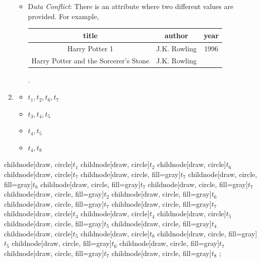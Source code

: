 \documentclass{scrartcl}
\begin{document}
\begin{enumerate}
\begin{itemize}
			\item D\textit{ata Conflict}: There is an attribute where two different values are provided.
			For example,
			\begin{center}
				\begin{tabular}{|c|c|c|}
					\hline
					title & author & year\\
					\hline
					Harry Potter 1 & J.K. Rowling & 1996\\
					Harry Potter and the Sorcerer's Stone & J.K. Rowling &\\
					\hline
				\end{tabular}.
			\end{center}
		\end{itemize}
		
		\item\phantom{phantom}
		\begin{itemize}
			\item $t_1, t_2, t_6, t_7$
			\item $t_3, t_4, t_5$
			\item $t_4, t_5$
			\item $t_4, t_8$
		\end{itemize}
	\end{enumerate}
	\begin{landscape}
		\pagestyle{empty}
		\begin{center}
			\hspace*{-5.5cm}
			\begin{tikz}[level 1/.style={sibling distance=3.7cm},
				level 2/.style={sibling distance=1.5cm},
				level 3/.style={sibling distance=1cm},
				level 4/.style={sibling distance=3cm}]
				child{node[draw, circle]{$t_1$}
					child{node[draw, circle]{$t_2$}
						child{node[draw, circle]{$t_6$}
							child{node[draw, circle]{$t_7$}
							}
						}
						child{node[draw, circle, fill=gray]{$t_7$}
						}
					}
					child{node[draw, circle, fill=gray]{$t_6$}
						child{node[draw, circle, fill=gray]{$t_7$}
						}
					}
					child{node[draw, circle, fill=gray]{$t_7$}
					}
				}
				child{node[draw, circle, fill=gray]{$t_2$}
					child{node[draw, circle, fill=gray]{$t_6$}
						child{node[draw, circle, fill=gray]{$t_7$}
						}
					}
					child{node[draw, circle, fill=gray]{$t_7$}
					}
				}
				child{node[draw, circle]{$t_3$}
					child{node[draw, circle]{$t_4$}
						child{node[draw, circle]{$t_5$}
						}
					}
					child{node[draw, circle, fill=gray]{$t_5$}
					}
				}
				child{node[draw, circle, fill=gray]{$t_4$}
					child{node[draw, circle]{$t_5$}
					}
					child{node[draw, circle]{$t_8$}
					}
				}
				child{node[draw, circle, fill=gray]{$t_5$}
				}
				child{node[draw, circle, fill=gray]{$t_6$}
					child{node[draw, circle, fill=gray]{$t_7$}
					}
				}
				child{node[draw, circle, fill=gray]{$t_7$}
				}
				child{node[draw, circle, fill=gray]{$t_8$}
				};
			\end{tikz}
		\end{center}
	\end{landscape}
	
\end{document}
